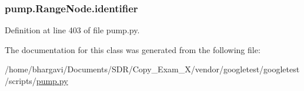 \subsubsection[{\texorpdfstring{identifier}{identifier}}]{\setlength{\rightskip}{0pt plus 5cm}pump.\+Range\+Node.\+identifier}\hypertarget{classpump_1_1_range_node_ae75b9f31ba8c3bd048cf09b22035efa0}{}\label{classpump_1_1_range_node_ae75b9f31ba8c3bd048cf09b22035efa0}


Definition at line 403 of file pump.\+py.



The documentation for this class was generated from the following file\+:\begin{DoxyCompactItemize}
\item 
/home/bhargavi/\+Documents/\+S\+D\+R/\+Copy\+\_\+\+Exam\+\_\+X/vendor/googletest/googletest/scripts/\hyperlink{pump_8py}{pump.\+py}\end{DoxyCompactItemize}
